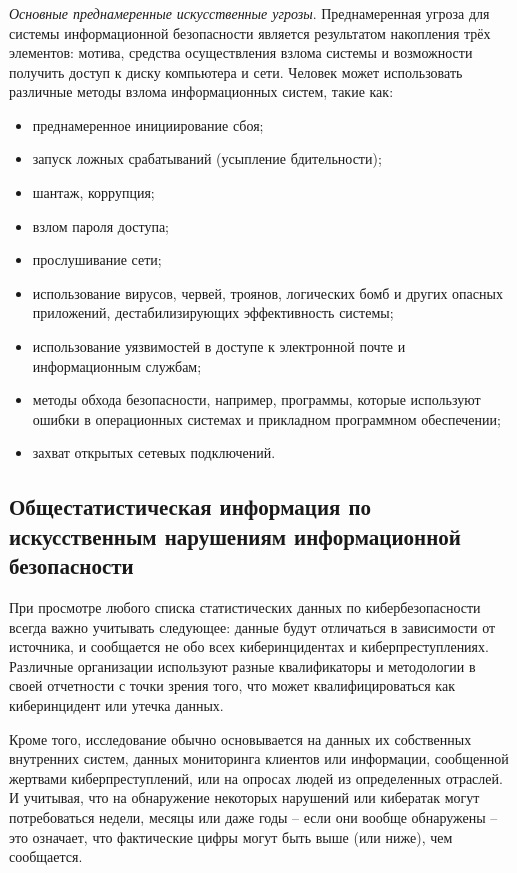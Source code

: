 \subsubsection{}
\label{subsubsec:problems:threats:intentional}

\textit{Основные преднамеренные искусственные угрозы}. Преднамеренная угроза для системы информационной безопасности является результатом накопления трёх элементов: мотива, средства осуществления взлома системы и возможности получить доступ к диску компьютера и сети.
Человек может использовать различные методы взлома информационных систем, такие как:
\begin{itemize}
	\item преднамеренное инициирование сбоя;
	\item запуск ложных срабатываний (усыпление бдительности);
	\item шантаж, коррупция;
	\item взлом пароля доступа;
	\item прослушивание сети;
	\item использование вирусов, червей, троянов, логических бомб \cite{zhigulin} и других опасных приложений, дестабилизирующих эффективность системы;
	\item использование уязвимостей в доступе к электронной почте и информационным службам;
	\item методы обхода безопасности, например, программы, которые используют ошибки в операционных системах и прикладном программном обеспечении;
	\item захват открытых сетевых подключений.
\end{itemize}

\subsection{Общестатистическая информация по искусственным нарушениям информационной безопасности}
\label{subsec:problems:stats}

При просмотре любого списка статистических данных по кибербезопасности всегда важно учитывать следующее: данные будут отличаться в зависимости от источника, и сообщается не обо всех киберинцидентах и киберпреступлениях.
Различные организации используют разные квалификаторы и методологии в своей отчетности с точки зрения того, что может квалифицироваться как киберинцидент или утечка данных.

Кроме того, исследование обычно основывается на данных их собственных внутренних систем, данных мониторинга клиентов или информации, сообщенной жертвами киберпреступлений, или на опросах людей из определенных отраслей. И учитывая, что на обнаружение некоторых нарушений или
кибератак могут потребоваться недели, месяцы или даже годы – если они
вообще обнаружены – это означает, что фактические цифры могут быть выше
(или ниже), чем сообщается.


